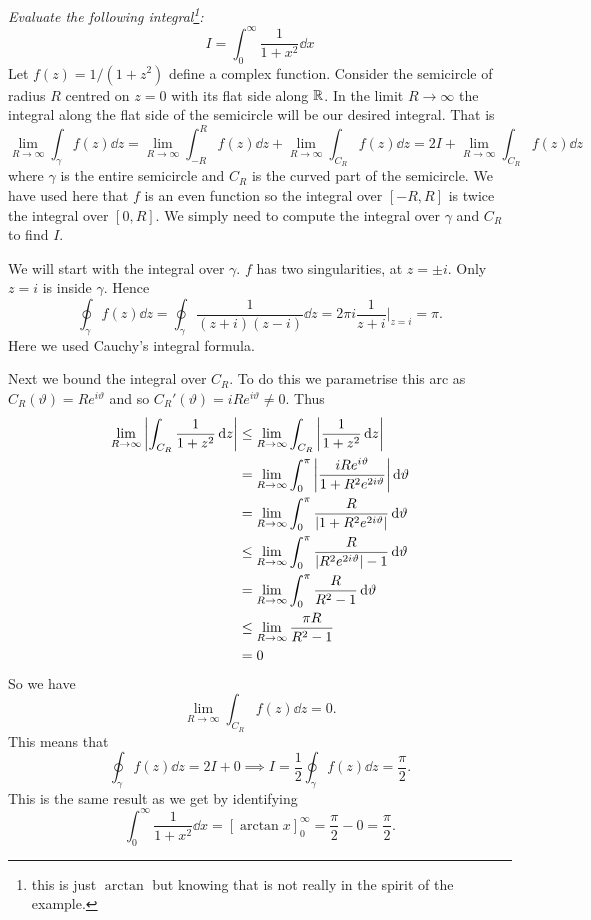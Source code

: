 \documentclass{article}
\begin{document}
    \begin{example}
        \emph{Evaluate the following integral\footnote{this is just \(\arctan\) but knowing that is not really in the spirit of the example.}:}
        \[I = \int_{0}^{\infty} \frac{1}{1 + x^2}\dd{x}\]
        Let \(f(z) = 1/(1 + z^2)\) define a complex function.
        Consider the semicircle of radius \(R\) centred on \(z = 0\) with its flat side along \(\mathbb{R}\).
        In the limit \(R \to \infty\) the integral along the flat side of the semicircle will be our desired integral.
        That is
        \[\lim_{R\to\infty} \int_{\gamma} f(z) \dd{z} = \lim_{R\to\infty} \int_{-R}^{R} f(z) \dd{z} + \lim_{R\to\infty}\int_{C_R} f(z) \dd{z} = 2I + \lim_{R\to\infty} \int_{C_R} f(z)\dd{z}\]
        where \(\gamma\) is the entire semicircle and \(C_{R}\) is the curved part of the semicircle.
        We have used here that \(f\) is an even function so the integral over \([-R, R]\) is twice the integral over \([0, R]\).
        We simply need to compute the integral over \(\gamma\) and \(C_R\) to find \(I\).
        
        We will start with the integral over \(\gamma\).
        \(f\) has two singularities, at \(z = \pm i\).
        Only \(z = i\) is inside \(\gamma\).
        Hence
        \[\oint_{\gamma} f(z) \dd{z} = \oint_{\gamma}\frac{1}{(z + i)(z - i)}\dd{z} = 2\pi i\frac{1}{z + i}\bigg|_{z=i} = \pi.\]
        Here we used Cauchy's integral formula.
        
        Next we bound the integral over \(C_R\).
        To do this we parametrise this arc as \(C_R(\vartheta) = Re^{i\vartheta}\) and so \(C_R'(\vartheta) = iRe^{i\vartheta} \ne 0\).
        Thus
        \begin{align*}
            \lim_{R\to\infty} \abs{\int_{C_R} \frac{1}{1 + z^2}\dd{z}} &\le \lim_{R\to\infty} \int_{C_R}\abs{\frac{1}{1 + z^2}\dd{z}}\\
            &= \lim_{R\to\infty} \int_{0}^{\pi} \abs{\frac{iRe^{i\vartheta}}{1 + R^2e^{2i\vartheta}}}\dd{\vartheta}\\
            &= \lim_{R\to\infty} \int_{0}^{\pi} \frac{R}{\abs{1 + R^2e^{2i\vartheta}}} \dd{\vartheta}\\
            &\le \lim_{R\to\infty} \int_{0}^{\pi} \frac{R}{\abs{R^2e^{2i\vartheta}} - 1} \dd{\vartheta}\\
            &= \lim_{R\to\infty} \int_{0}^{\pi} \frac{R}{R^2 - 1}\dd{\vartheta}\\
            &\le \lim_{R\to\infty}\frac{\pi R}{R^2 - 1}\\
            &= 0
        \end{align*}
        So we have
        \[\lim_{R\to\infty}\int_{C_R} f(z) \dd{z} = 0.\]
        This means that
        \[\oint_{\gamma} f(z) \dd{z} = 2I + 0 \implies I = \frac{1}{2} \oint_{\gamma}f(z)\dd{z} = \frac{\pi}{2}.\]
        This is the same result as we get by identifying
        \[\int_{0}^{\infty} \frac{1}{1 + x^2} \dd{x} = [\arctan x]_{0}^{\infty} = \frac{\pi}{2} - 0 = \frac{\pi}{2}.\]
    \end{example}
    
\end{document}
